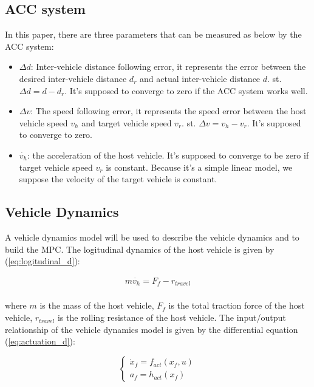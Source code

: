 \documentclass{article}
\numberwithin{equation}{section}
\begin{document}
\subsection{ACC system}
In this paper, there are three parameters that can be measured as below by the ACC system:
\begin{itemize}
    \item $\Delta d$: Inter-vehicle distance following error, it represents the error between the 
    desired inter-vehicle distance $d_r$ and actual inter-vehicle distance $d$. st. $\Delta d=d-d_r$. 
    It's supposed to converge to zero if the ACC system works well.
    \item $\Delta v$: The speed following error, it represents the speed error between the 
    host vehicle speed $v_h$ and target vehicle speed $v_r$. st. $\Delta v=v_h-v_r$. 
    It's supposed to converge to zero.
    \item $\dot{v_h}$: the acceleration of the host vehicle. It's supposed to converge to
    be zero if target vehicle speed $v_r$ is constant. Because it's a simple linear model, we
    suppose the velocity of the target vehicle is constant.
\end{itemize}
\subsection{Vehicle Dynamics}
A vehicle dynamics model\cite{Takahama} will be used to describe the vehicle dynamics and to 
build the MPC. The logitudinal dynamics of the host vehicle is given by (\ref{eq:logitudinal_d}):

\begin{equation}
    \begin{aligned}
        m\dot{v_h}=F_f-r_{travel}\label{eq:logitudinal_d}\\
    \end{aligned}
\end{equation}

\noindent where $m$ is the mass of the host vehicle, $F_f$ is the total traction force of the host vehicle, 
$r_{travel}$ is the rolling resistance of the host vehicle. The input/output relationship of
the vehicle dynamics model is given by the differential equation (\ref{eq:actuation_d}):

\begin{equation}
    \left\{\begin{array}{l}\label{eq:actuation_d}
            \dot{x}_{f}=f_{a c t}\left(x_{f}, u\right) \\
            a_{f}=h_{a c t}\left(x_{f}\right)
            \end{array}\right.
\end{equation}
\end{document}
